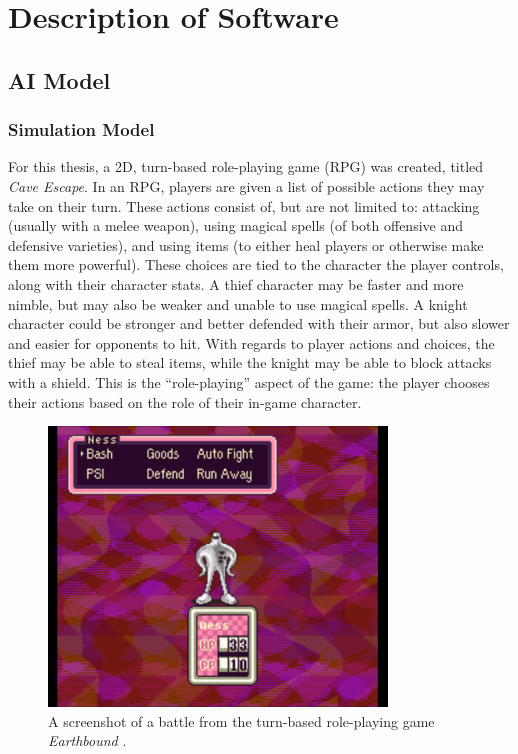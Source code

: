 \chapter{Description of Software}
\section{AI Model}
\subsection{Simulation Model}
For this thesis, a 2D, turn-based role-playing game (RPG) was created, titled \textit{Cave Escape}. In an RPG, players are given a list of possible actions they may take on their turn. These actions consist of, but are not limited to: attacking (usually with a melee weapon), using magical spells (of both offensive and defensive varieties), and using items (to either heal players or otherwise make them more powerful). These choices are tied to the character the player controls, along with their character stats. A thief character may be faster and more nimble, but may also be weaker and unable to use magical spells. A knight character could be stronger and better defended with their armor, but also slower and easier for opponents to hit. With regards to player actions and choices, the thief may be able to steal items, while the knight may be able to block attacks with a shield. This is the ``role-playing'' aspect of the game: the player chooses their actions based on the role of their in-game character.\\

\begin{figure}[H]
  \centering
  \includegraphics[width=9cm]{figures/Earthbound.png}
  \caption{A screenshot of a battle from the turn-based role-playing game \textit{Earthbound} \cite{earthbound94}.}
  \label{fig:Earthbound}
\end{figure}

